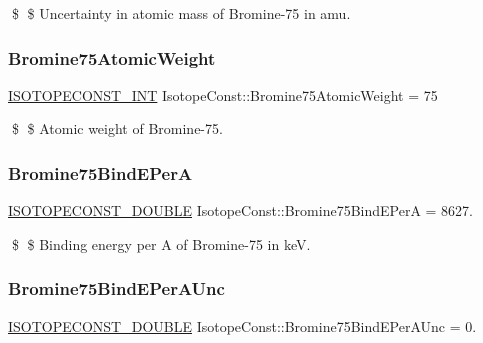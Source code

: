 \$ \$ Uncertainty in atomic mass of Bromine-\/75 in amu. \mbox{\label{group___isotope_const-_bromine-_br75_ga9b7f3f2c4716a8525a1509d402de6d97}} 
\subsubsection{\texorpdfstring{Bromine75\+Atomic\+Weight}{Bromine75AtomicWeight}}
{\footnotesize\ttfamily \mbox{\hyperlink{group___isotope_const-_macros_ga5f18360b3e99483a35c32d789e62621c}{I\+S\+O\+T\+O\+P\+E\+C\+O\+N\+S\+T\+\_\+\+I\+NT}} Isotope\+Const\+::\+Bromine75\+Atomic\+Weight = 75}

\$ \$ Atomic weight of Bromine-\/75. \mbox{\label{group___isotope_const-_bromine-_br75_gadf76570549860cd3d67086f8ffa4568a}} 
\subsubsection{\texorpdfstring{Bromine75\+Bind\+E\+PerA}{Bromine75BindEPerA}}
{\footnotesize\ttfamily \mbox{\hyperlink{group___isotope_const-_macros_ga8f45a7272ce02c0b4c65c44636ed719a}{I\+S\+O\+T\+O\+P\+E\+C\+O\+N\+S\+T\+\_\+\+D\+O\+U\+B\+LE}} Isotope\+Const\+::\+Bromine75\+Bind\+E\+PerA = 8627.}

\$ \$ Binding energy per A of Bromine-\/75 in keV. \mbox{\label{group___isotope_const-_bromine-_br75_gac5f120793e187fd0c07dd7a274d31552}} 
\subsubsection{\texorpdfstring{Bromine75\+Bind\+E\+Per\+A\+Unc}{Bromine75BindEPerAUnc}}
{\footnotesize\ttfamily \mbox{\hyperlink{group___isotope_const-_macros_ga8f45a7272ce02c0b4c65c44636ed719a}{I\+S\+O\+T\+O\+P\+E\+C\+O\+N\+S\+T\+\_\+\+D\+O\+U\+B\+LE}} Isotope\+Const\+::\+Bromine75\+Bind\+E\+Per\+A\+Unc = 0.}

